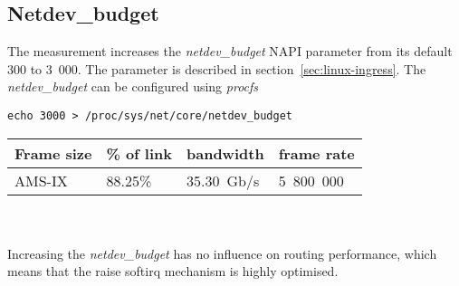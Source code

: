 
\subsection{Netdev\_budget}
The measurement increases the {\it{netdev\_budget}} NAPI parameter from its default 300 to 3~000.
The parameter is described in section~\ref{sec:linux-ingress}.
The {\it{netdev\_budget}} can be configured using {\it{procfs}}
\begin{lstlisting}
echo 3000 > /proc/sys/net/core/netdev_budget
\end{lstlisting}

\begin{tabular}{ | l | l | l | l | }
\hline
Frame size & \% of link & bandwidth & frame rate \\
\hline
AMS-IX & 88.25\% & 35.30~Gb/s & 5~800~000 \\
\hline
\end{tabular}
\\
\\
Increasing the {\it{netdev\_budget}} has no influence on routing performance,
which means that the raise softirq mechanism is highly optimised.
